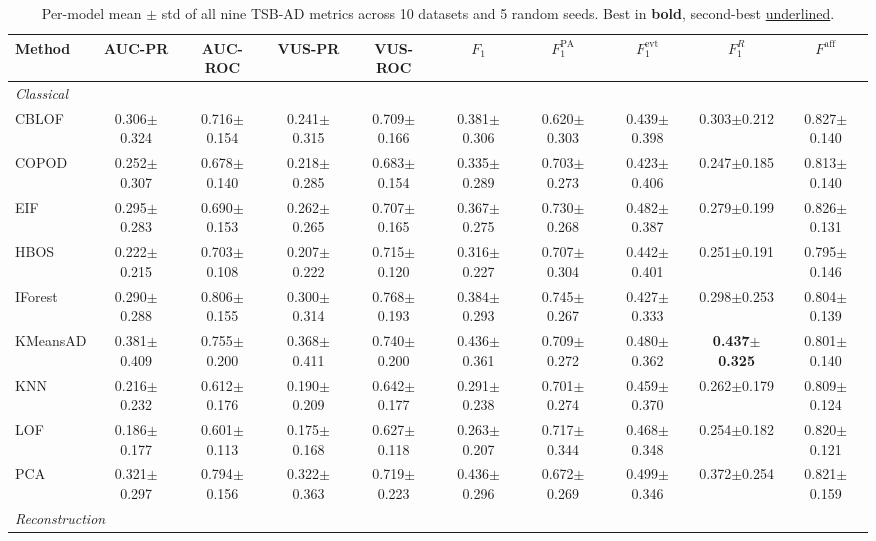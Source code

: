 \begin{table}[t]
\centering
\small
\caption{Per-model mean $\pm$ std of all nine TSB-AD metrics across 10 datasets and 5 random seeds. Best in \textbf{bold}, second-best \underline{underlined}.}
\label{tab:ranking-all-metrics}
\begin{tabular}{lccccccccc}
\toprule
Method & AUC-PR & AUC-ROC & VUS-PR & VUS-ROC & $F_1$ & $F_1^{\text{PA}}$ & $F_1^{\text{evt}}$ & $F_1^{R}$ & $F^{\text{aff}}$ \\
\midrule
\multicolumn{10}{l}{\textit{Classical}} \\
CBLOF & 0.306$\pm$0.324 & 0.716$\pm$0.154 & 0.241$\pm$0.315 & 0.709$\pm$0.166 & 0.381$\pm$0.306 & 0.620$\pm$0.303 & 0.439$\pm$0.398 & 0.303$\pm$0.212 & 0.827$\pm$0.140 \\
COPOD & 0.252$\pm$0.307 & 0.678$\pm$0.140 & 0.218$\pm$0.285 & 0.683$\pm$0.154 & 0.335$\pm$0.289 & 0.703$\pm$0.273 & 0.423$\pm$0.406 & 0.247$\pm$0.185 & 0.813$\pm$0.140 \\
EIF & 0.295$\pm$0.283 & 0.690$\pm$0.153 & 0.262$\pm$0.265 & 0.707$\pm$0.165 & 0.367$\pm$0.275 & 0.730$\pm$0.268 & 0.482$\pm$0.387 & 0.279$\pm$0.199 & 0.826$\pm$0.131 \\
HBOS & 0.222$\pm$0.215 & 0.703$\pm$0.108 & 0.207$\pm$0.222 & 0.715$\pm$0.120 & 0.316$\pm$0.227 & 0.707$\pm$0.304 & 0.442$\pm$0.401 & 0.251$\pm$0.191 & 0.795$\pm$0.146 \\
IForest & 0.290$\pm$0.288 & 0.806$\pm$0.155 & 0.300$\pm$0.314 & 0.768$\pm$0.193 & 0.384$\pm$0.293 & 0.745$\pm$0.267 & 0.427$\pm$0.333 & 0.298$\pm$0.253 & 0.804$\pm$0.139 \\
KMeansAD & 0.381$\pm$0.409 & 0.755$\pm$0.200 & 0.368$\pm$0.411 & 0.740$\pm$0.200 & 0.436$\pm$0.361 & 0.709$\pm$0.272 & 0.480$\pm$0.362 & \textbf{0.437$\pm$0.325} & 0.801$\pm$0.140 \\
KNN & 0.216$\pm$0.232 & 0.612$\pm$0.176 & 0.190$\pm$0.209 & 0.642$\pm$0.177 & 0.291$\pm$0.238 & 0.701$\pm$0.274 & 0.459$\pm$0.370 & 0.262$\pm$0.179 & 0.809$\pm$0.124 \\
LOF & 0.186$\pm$0.177 & 0.601$\pm$0.113 & 0.175$\pm$0.168 & 0.627$\pm$0.118 & 0.263$\pm$0.207 & 0.717$\pm$0.344 & 0.468$\pm$0.348 & 0.254$\pm$0.182 & 0.820$\pm$0.121 \\
PCA & 0.321$\pm$0.297 & 0.794$\pm$0.156 & 0.322$\pm$0.363 & 0.719$\pm$0.223 & 0.436$\pm$0.296 & 0.672$\pm$0.269 & 0.499$\pm$0.346 & 0.372$\pm$0.254 & 0.821$\pm$0.159 \\
\midrule
\multicolumn{10}{l}{\textit{Reconstruction}} \\

\end{tabular}
\end{table}
